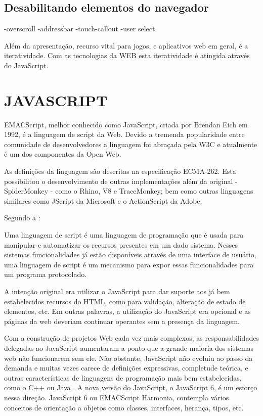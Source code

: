 \documentclass[
12pt,
a4paper,
portuges,
draft
]{report}
\renewenvironment{quote}
               {\list{}{\rightmargin\leftmargin}%
                \item\relax\fontsize{10}{12}}
               {\endlist}
\begin{document}
\subsection{Desabilitando elementos do navegador}
-overscroll
-addressbar
-touch-callout
-user select


Além da apresentação, recurso vital para jogos, e aplicativos web em geral, é a iteratividade. Com
as tecnologias da WEB esta iteratividade é atingida através do JavaScript.

\section{JAVASCRIPT}

EMACScript, melhor conhecido como JavaScript, criada por Brendan Eich
em 1992, é a linguagem de script da Web. Devido a tremenda popularidade entre
comunidade de desenvolvedores a linguagem foi abraçada pela W3C e
atualmente é um dos componentes da Open Web.

As definições da linguagem são descritas na especificação ECMA-262.
Esta possibilitou o desenvolvimento de outras implementações além da
original - SpiderMonkey - como o Rhino, V8 e TraceMonkey; bem como
outras linguagens similares como JScript da Microsoft e o ActionScript
da Adobe.

Segundo a \cite{ecmaSpecificaton}:
\begin{quote}
Uma linguagem de script é uma linguagem de programação que é
usada para manipular e automatizar os recursos presentes em um dado
sistema. Nesses sistemas funcionalidades já estão disponíveis
através de uma interface de usuário, uma linguagem de script é
um mecanismo para expor essas funcionalidades para um programa
protocolado.
\end{quote}

A intenção original era utilizar o JavaScript para dar suporte aos já
bem estabelecidos recursos do HTML, como para validação, alteração
de estado de elementos, etc. Em outras palavras, a utilização do
JavaScript era opcional e as páginas da web deveriam continuar
operantes sem a presença da linguagem.

Com a construção de projetos Web cada vez mais complexos, as
responsabilidades delegadas ao JavaScript aumentaram a ponto que a
grande maioria dos sistemas web não funcionarem sem ele. Não obstante,
JavaScript não evoluiu ao passo da demanda e muitas vezes carece de
definições expressivas, completude teórica, e outras características
de linguagens de programação mais bem estabelecidas, como o C++ ou
Java \autocite{crossPlatformMobileGame}. A nova versão do JavaScript, o
JavaScript 6, é um esforço nessa direção. JavaScript 6 ou EMACScript
Harmonia, contempla vários conceitos de orientação a objetos como
classes, interfaces, herança, tipos, etc.
\end{document}

